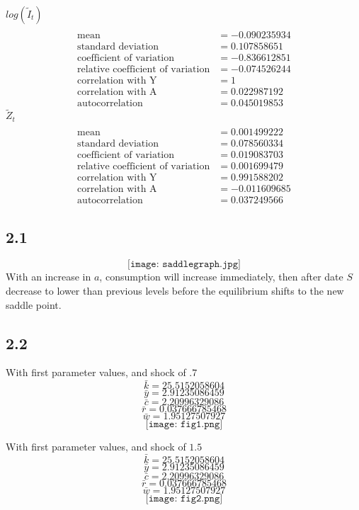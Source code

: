 \documentclass[letterpaper,12pt]{article}
\theoremstyle{definition}
\begin{document}
$log(\tilde{I}_t)$
\begin{align*}
\\\text{mean} &= -0.090235934
\\\text{standard deviation} &= 	0.107858651
\\\text{coefficient of variation}&=-0.836612851
\\\text{relative coefficient of variation}&=-0.074526244
\\\text{correlation with Y}&=1
\\\text{correlation with A}&=0.022987192
\\\text{autocorrelation}&=0.045019853
\end{align*}
$\tilde{Z}_t$
\begin{align*}
\\\text{mean} &= 0.001499222	
\\\text{standard deviation} &=  0.078560334
\\\text{coefficient of variation}&=0.019083703
\\\text{relative coefficient of variation}&=0.001699479
\\\text{correlation with Y}&=0.991588202
\\\text{correlation with A}&=-0.011609685
\\\text{autocorrelation}&=0.037249566
\end{align*}






\subsection*{2.1}
\[\texttt{[image: saddlegraph.jpg]}\]
With an increase in $a$, consumption will increase immediately, then after date $S$ decrease to lower than previous levels before the equilibrium shifts to the new saddle point.
\subsection*{2.2}
With first parameter values, and shock of $.7$
\[\bar k = 25.5152058604\]
\[\bar y =  2.91235086459 \]
\[\bar c = 2.20996329086 \]
\[\bar r = 0.037666785468 \]
\[\bar w = 1.95127507927\]
\[\texttt{[image: fig1.png]}\]

With first parameter values, and shock of $1.5$
\[\bar k = 25.5152058604\]
\[\bar y =  2.91235086459 \]
\[\bar c = 2.20996329086 \]
\[\bar r = 0.037666785468 \]
\[\bar w = 1.95127507927\]
\[\texttt{[image: fig2.png]}\]
\end{document}
